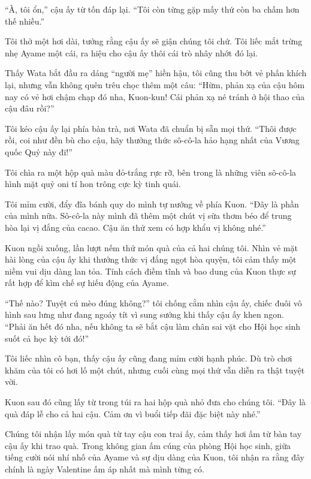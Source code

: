 \documentclass[../main.tex]{subfiles}
\begin{document}
``À, tôi ổn,'' cậu ấy từ tốn đáp lại. ``Tôi còn từng gặp mấy thứ còn ba chấm hơn thế nhiều.''

Tôi thở một hơi dài, tưởng rằng cậu ấy sẽ giận chúng tôi chứ. Tôi liếc mắt trừng nhẹ Ayame một cái, ra hiệu cho cậu ấy thôi cái trò nhây nhớt đó lại.


Thấy Wata bắt đầu ra dáng ``người mẹ'' hiền hậu, tôi cũng thu bớt vẻ phấn khích lại, nhưng vẫn không quên trêu chọc thêm một câu: ``Hừm, phản xạ của cậu hôm nay có vẻ hơi chậm chạp đó nha, Kuon-kun! Cái phản xạ né tránh ở hội thao của cậu đâu rồi?''

Tôi kéo cậu ấy lại phía bàn trà, nơi Wata đã chuẩn bị sẵn mọi thứ. ``Thôi được rồi, coi như đền bù cho cậu, hãy thưởng thức sô-cô-la hảo hạng nhất của Vương quốc Quỷ này đi!''

Tôi chìa ra một hộp quà màu đỏ-trắng rực rỡ, bên trong là những viên sô-cô-la hình mặt quỷ oni tí hon trông cực kỳ tinh quái.


Tôi mỉm cười, đẩy đĩa bánh quy do mình tự nướng về phía Kuon. ``Đây là phần của mình nữa. Sô-cô-la này mình đã thêm một chút vị sữa thơm béo để trung hòa lại vị đắng của cacao. Cậu ăn thử xem có hợp khẩu vị không nhé.''

Kuon ngồi xuống, lần lượt nếm thử món quà của cả hai chúng tôi. Nhìn vẻ mặt hài lòng của cậu ấy khi thưởng thức vị đắng ngọt hòa quyện, tôi cảm thấy một niềm vui dịu dàng lan tỏa. Tính cách điềm tĩnh và bao dung của Kuon thực sự rất hợp để kìm chế sự hiếu động của Ayame.


``Thế nào? Tuyệt cú mèo đúng không?'' tôi chống cằm nhìn cậu ấy, chiếc đuôi vô hình sau lưng như đang ngoáy tít vì sung sướng khi thấy cậu ấy khen ngon. ``Phải ăn hết đó nha, nếu không ta sẽ bắt cậu làm chân sai vặt cho Hội học sinh suốt cả học kỳ tới đó!''

Tôi liếc nhìn cô bạn, thấy cậu ấy cũng đang mỉm cười hạnh phúc. Dù trò chơi khăm của tôi có hơi lố một chút, nhưng cuối cùng mọi thứ vẫn diễn ra thật tuyệt vời.


Kuon sau đó cũng lấy từ trong túi ra hai hộp quà nhỏ đưa cho chúng tôi. ``Đây là quà đáp lễ cho cả hai cậu. Cảm ơn vì buổi tiếp đãi đặc biệt này nhé.''

Chúng tôi nhận lấy món quà từ tay cậu con trai ấy, cảm thấy hơi ấm từ bàn tay cậu ấy khi trao quà. Trong không gian ấm cúng của phòng Hội học sinh, giữa tiếng cười nói nhí nhố của Ayame và sự dịu dàng của Kuon, tôi nhận ra rằng đây chính là ngày Valentine ấm áp nhất mà mình từng có.
\end{document}
